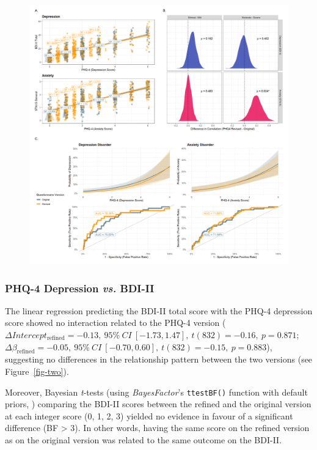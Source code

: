 \documentclass[
  man,
  floatsintext,
  longtable,
  nolmodern,
  notxfonts,
  notimes,
  colorlinks=true,linkcolor=blue,citecolor=blue,urlcolor=blue]{apa7}
\begin{document}
\begin{figure}[!htbp]
\includegraphics[width=1\textwidth,height=\textheight]{../../study2/analysis/2_analysis_files/figure-html/figure-1.png}

\end{figure}

\subsubsection{\texorpdfstring{PHQ-4 Depression \emph{vs.}
BDI-II}{PHQ-4 Depression vs. BDI-II}}\label{phq-4-depression-vs.-bdi-ii}

The linear regression predicting the BDI-II total score with the PHQ-4
depression score showed no interaction related to the PHQ-4 version
(\(\Delta Intercept_{\text{refined}} =  -0.13,~95\%~CI~[-1.73, 1.47],~t(832) =  -0.16,~p = 0.871\);
\(\Delta \beta_{\text{refined}} = -0.05,~95\%~CI~[-0.70, 0.60],~t(832) = -0.15,~p = 0.883\)),
suggesting no differences in the relationship pattern between the two
versions (see Figure~\ref{fig-two}).

Moreover, Bayesian \emph{t}-tests (using \emph{BayesFactor}'s
\texttt{ttestBF()} function with default priors,
) comparing the
BDI-II scores between the refined and the original version at each
integer score (0, 1, 2, 3) yielded no evidence in favour of a
significant difference (BF \textgreater{} 3). In other words, having the
same score on the refined version as on the original version was related
to the same outcome on the BDI-II.
\end{document}
